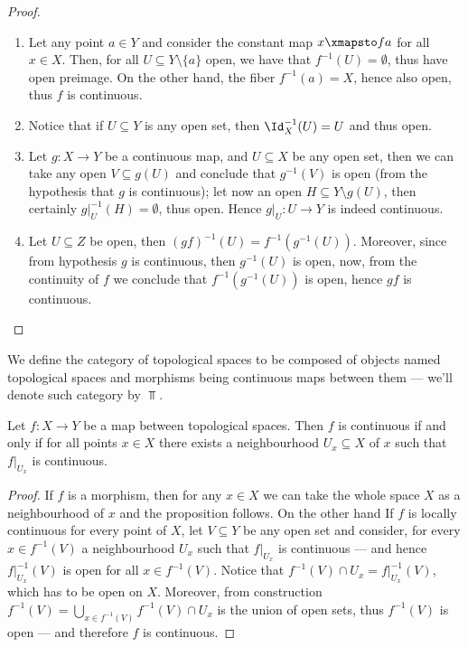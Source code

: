 \begin{proof}
\begin{enumerate}[(1)]\setlength\itemsep{0em}
\item Let any point \(a \in Y\) and consider the constant map \(x \xmapsto f a\)
  for all \(x \in X\). Then, for all \(U \subseteq Y \setminus \{a\}\) open, we
  have that \(f^{-1}(U) = \emptyset\), thus have open preimage. On the other
  hand, the fiber \(f^{-1}(a) = X\), hence also open, thus \(f\) is continuous.

\item Notice that if \(U \subseteq Y\) is any open set, then \(\Id_X^{-1}(U) =
  U\) and thus open.

\item Let \(g : X \to Y\) be a continuous map, and \(U \subseteq X\) be any open
  set, then we can take any open \(V \subseteq g(U)\) and conclude that
  \(g^{-1}(V)\) is open (from the hypothesis that \(g\) is continuous); let now
  an open \(H \subseteq Y \setminus g(U)\), then certainly \(g|_U^{-1}(H) =
  \emptyset\), thus open. Hence \(g|_U : U \to Y\) is indeed continuous.

\item Let \(U \subseteq Z\) be open, then \((g f)^{-1}(U) = f^{-1}
  (g^{-1}(U))\). Moreover, since from hypothesis \(g\) is continuous, then
  \(g^{-1}(U)\) is open, now, from the continuity of \(f\) we conclude that
  \(f^{-1}(g^{-1}(U))\) is open, hence \(g f\) is continuous.
\end{enumerate}
\end{proof}

\begin{definition}
We define the category of topological spaces to be composed of objects named
topological spaces and morphisms being continuous maps between them --- we'll
denote such category by \(\Top\).
\end{definition}

\begin{proposition}
\label{prop: local criterion for continuity}
Let \(f: X \to Y\) be a map between topological spaces. Then \(f\) is continuous
if and only if for all points \(x \in X\) there exists a neighbourhood \(U_x
\subseteq X\) of \(x\) such that \(f|_{U_x}\) is continuous.
\end{proposition}

\begin{proof}
If \(f\) is a morphism, then for any \(x \in X\) we can take the whole space
\(X\) as a neighbourhood of \(x\) and the proposition follows. On the other hand
If \(f\) is locally continuous for every point of \(X\), let \(V \subseteq Y\)
be any open set and consider, for every \(x \in f^{-1}(V)\) a neighbourhood
\(U_x\) such that \(f|_{U_x}\) is continuous --- and hence \(f|_{U_x}^{-1}(V)\)
is open for all \(x \in f^{-1}(V)\). Notice that \(f^{-1}(V) \cap U_x =
f|_{U_x}^{-1}(V)\), which has to be open on \(X\). Moreover, from construction
\(f^{-1}(V) = \bigcup_{x \in f^{-1}(V)} f^{-1}(V) \cap U_x\) is the union of
open sets, thus \(f^{-1}(V)\) is open --- and therefore \(f\) is continuous.
\end{proof}

